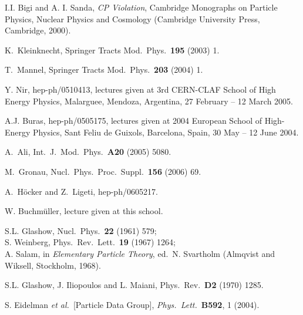 \documentclass[11pt]{cernrep}
\begin{document}
\begin{thebibliography}{999}
I.I. Bigi and A. I. Sanda, {\it CP Violation},
Cambridge Monographs on Particle Physics, Nuclear Physics and 
Cosmology (Cambridge University Press, Cambridge, 2000).

K.~Kleinknecht,
  Springer Tracts Mod.\ Phys.\  {\bf 195} (2003) 1.

T.~Mannel,
  Springer Tracts Mod.\ Phys.\  {\bf 203} (2004) 1.

Y. Nir,   hep-ph/0510413, 
lectures given at 3rd CERN-CLAF School of High Energy Physics, Malarguee, Mendoza, Argentina, 27 February -- 12 March 2005.
  
A.J. Buras,
  hep-ph/0505175, lectures given at 2004 European School of High-Energy Physics, 
  Sant Feliu de Guixols, Barcelona, Spain, 30 May -- 12 June 2004. 
    
A.~Ali,
   Int.\ J.\ Mod.\ Phys.\  {\bf A20} (2005) 5080.
  
 M.~Gronau,
  Nucl.\ Phys.\ Proc.\ Suppl.\  {\bf 156} (2006) 69.
  
A.~H\"ocker and Z.~Ligeti,
 hep-ph/0605217.
    
W. Buchm\"uller, lecture given at this school.

S.L. Glashow, { Nucl.\ Phys.}~{\bf 22} (1961) 579;\\
S. Weinberg, { Phys.\ Rev.\ Lett.}~{\bf 19} (1967) 1264;\\ 
A. Salam, in {\it Elementary Particle Theory}, ed.\ N. Svartholm 
(Almqvist and Wiksell, Stockholm, 1968).


S.L. Glashow, J. Iliopoulos and L. Maiani,
{ Phys.\ Rev.}~{\bf D2} (1970) 1285.

S. Eidelman {\it et al.}\ [Particle Data Group],
{\it  Phys.\ Lett.}~{\bf B592}, 1 (2004).



\end{thebibliography}
\end{document}
